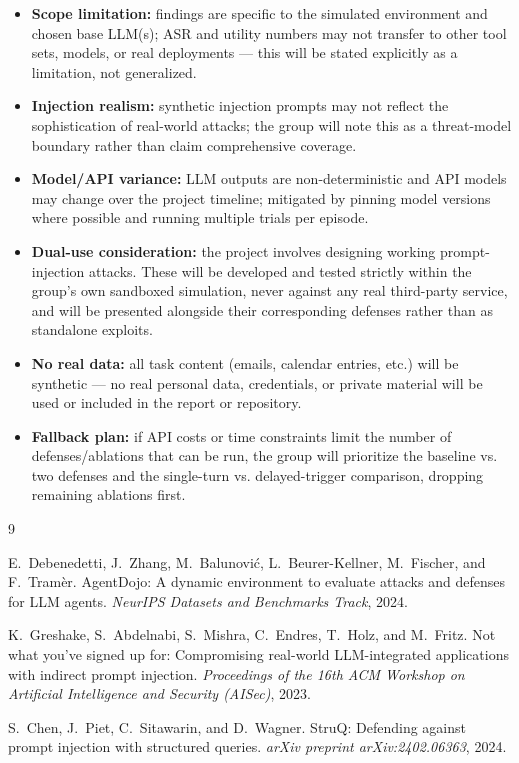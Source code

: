 \documentclass[11pt]{article}
\begin{document}
\begin{itemize}[leftmargin=*,itemsep=0.25em]
    \item \textbf{Scope limitation:} findings are specific to the simulated environment and chosen base LLM(s); ASR and utility numbers may not transfer to other tool sets, models, or real deployments — this will be stated explicitly as a limitation, not generalized.
    \item \textbf{Injection realism:} synthetic injection prompts may not reflect the sophistication of real-world attacks; the group will note this as a threat-model boundary rather than claim comprehensive coverage.
    \item \textbf{Model/API variance:} LLM outputs are non-deterministic and API models may change over the project timeline; mitigated by pinning model versions where possible and running multiple trials per episode.
    \item \textbf{Dual-use consideration:} the project involves designing working prompt-injection attacks. These will be developed and tested strictly within the group's own sandboxed simulation, never against any real third-party service, and will be presented alongside their corresponding defenses rather than as standalone exploits.
    \item \textbf{No real data:} all task content (emails, calendar entries, etc.) will be synthetic — no real personal data, credentials, or private material will be used or included in the report or repository.
    \item \textbf{Fallback plan:} if API costs or time constraints limit the number of defenses/ablations that can be run, the group will prioritize the baseline vs. two defenses and the single-turn vs. delayed-trigger comparison, dropping remaining ablations first.
\end{itemize}

\begin{thebibliography}{9}

E.~Debenedetti, J.~Zhang, M.~Balunovi\'{c}, L.~Beurer-Kellner, M.~Fischer, and
F.~Tram\`{e}r.
\newblock AgentDojo: A dynamic environment to evaluate attacks and defenses
for LLM agents.
\newblock \emph{NeurIPS Datasets and Benchmarks Track}, 2024.

K.~Greshake, S.~Abdelnabi, S.~Mishra, C.~Endres, T.~Holz, and M.~Fritz.
\newblock Not what you've signed up for: Compromising real-world LLM-integrated
applications with indirect prompt injection.
\newblock \emph{Proceedings of the 16th ACM Workshop on Artificial
Intelligence and Security (AISec)}, 2023.

S.~Chen, J.~Piet, C.~Sitawarin, and D.~Wagner.
\newblock StruQ: Defending against prompt injection with structured queries.
\newblock \emph{arXiv preprint arXiv:2402.06363}, 2024.

\end{thebibliography}
\end{document}
